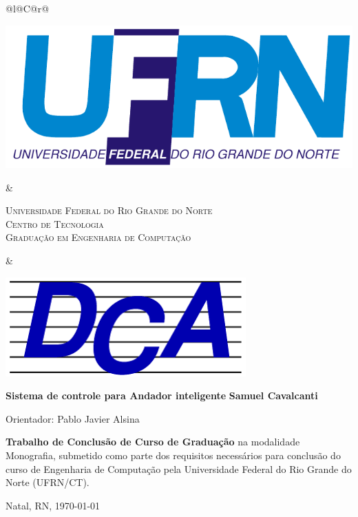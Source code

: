 %
%

\begin{titlepage}

\begin{center}

\small

\begin{tabularx}{\linewidth}{@{}l@{}C@{}r@{}}
\parbox[c]{3cm}{\includegraphics[width=\linewidth]{./figuras/UFRN}} &
\begin{center}
\textsf{\textsc{Universidade Federal do Rio Grande do Norte\\
Centro de Tecnologia\\
Graduação em Engenharia de Computação}}
\end{center} &
\parbox[c]{3cm}{\includegraphics[width=\linewidth]{./figuras/dca_logo.png}}
\end{tabularx}

\vfill
\LARGE
\textbf{Sistema de controle para Andador inteligente}
\vfill
\Large
\textbf{Samuel Cavalcanti}
\vfill

\normalsize

Orientador: Pablo Javier Alsina

\vfill

\hfill
\parbox{0.5\linewidth}{\textbf{%
Trabalho de Conclusão de Curso de Graduação} na modalidade Monografia, 
submetido como parte dos requisitos necessários para 
conclusão do curso de Engenharia de Computação pela 
Universidade Federal do Rio Grande do Norte (UFRN/CT).
}

\vfill

\large

Natal, RN, \today

\end{center}

\end{titlepage}
